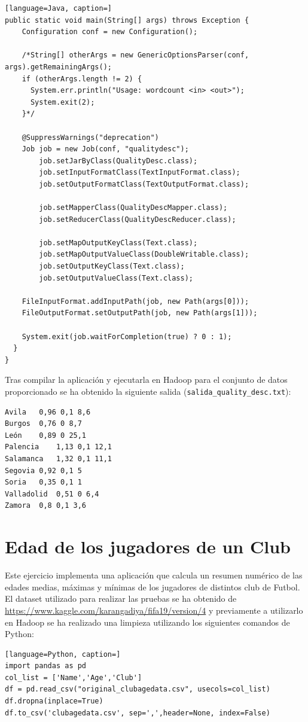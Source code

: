 \documentclass[10pt,swedish, openany]{book}
\begin{document}
\begin{lstlisting}[language=Java, caption=]
public static void main(String[] args) throws Exception {
    Configuration conf = new Configuration();

    /*String[] otherArgs = new GenericOptionsParser(conf, args).getRemainingArgs();
    if (otherArgs.length != 2) {
      System.err.println("Usage: wordcount <in> <out>");
      System.exit(2);
    }*/

    @SuppressWarnings("deprecation")
    Job job = new Job(conf, "qualitydesc");
		job.setJarByClass(QualityDesc.class);
		job.setInputFormatClass(TextInputFormat.class);
		job.setOutputFormatClass(TextOutputFormat.class);

		job.setMapperClass(QualityDescMapper.class);
		job.setReducerClass(QualityDescReducer.class);

		job.setMapOutputKeyClass(Text.class);
		job.setMapOutputValueClass(DoubleWritable.class);
		job.setOutputKeyClass(Text.class);
		job.setOutputValueClass(Text.class);

    FileInputFormat.addInputPath(job, new Path(args[0]));
    FileOutputFormat.setOutputPath(job, new Path(args[1]));

    System.exit(job.waitForCompletion(true) ? 0 : 1);
  }
}
\end{lstlisting}

Tras compilar la aplicación y ejecutarla en Hadoop para el conjunto de datos proporcionado se ha obtenido la siguiente salida (\texttt{salida\_quality\_desc.txt}):
\begin{verbatim}
Avila	0,96 0,1 8,6
Burgos	0,76 0 8,7
León	0,89 0 25,1
Palencia	1,13 0,1 12,1
Salamanca	1,32 0,1 11,1
Segovia	0,92 0,1 5
Soria	0,35 0,1 1
Valladolid	0,51 0 6,4
Zamora	0,8 0,1 3,6
\end{verbatim}

\section{Edad de los jugadores de un Club}
Este ejercicio implementa una aplicación que calcula un resumen numérico de las edades medias, máximas y mínimas de los jugadores de distintos club de Futbol. El dataset utilizado para realizar las pruebas se ha obtenido de \url{https://www.kaggle.com/karangadiya/fifa19/version/4} y previamente a utilizarlo en Hadoop se ha realizado una limpieza utilizando los siguientes comandos de Python:
\begin{lstlisting}[language=Python, caption=]
import pandas as pd
col_list = ['Name','Age','Club']
df = pd.read_csv("original_clubagedata.csv", usecols=col_list)
df.dropna(inplace=True)
df.to_csv('clubagedata.csv', sep=',',header=None, index=False)
\end{lstlisting}
\end{document}
